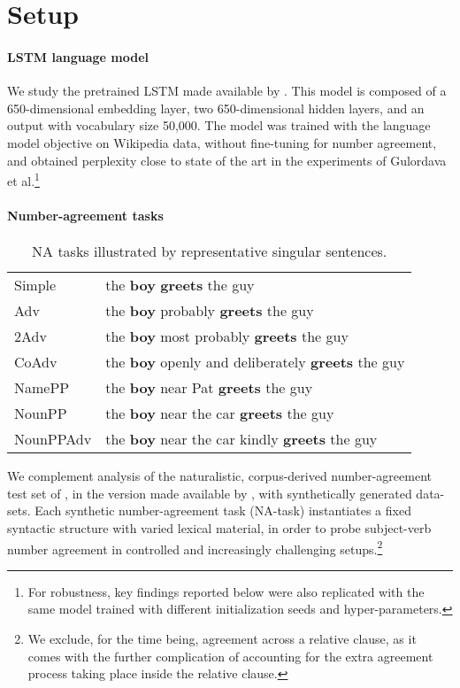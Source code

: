 \section{Setup}\label{sec:the_data}

\paragraph{LSTM language model}\label{ssec:lstm_lm}
We study the pretrained LSTM made available by
.  This model is composed of a
650-dimensional embedding layer, two 650-dimensional hidden layers,
and an output with vocabulary size 50,000. 
The model was trained with the language
model objective on Wikipedia data, without fine-tuning for number
agreement, and obtained perplexity close to state of the art in the experiments of Gulordava et al.\footnote{For robustness, key findings reported below were also replicated with the same model trained with different initialization seeds and hyper-parameters.} 


\paragraph{Number-agreement tasks}
\begin{table}[tb]
  \centering
  \begin{footnotesize}
  \begin{tabular}{l@{\hskip1pt}l}
    \B Simple & the \textbf{boy} \textbf{greets} the guy\\
    \B Adv & the \textbf{boy} probably \textbf{greets} the guy\\
    \B 2Adv & the \textbf{boy} most probably \textbf{greets} the guy\\
    \B CoAdv &  the \textbf{boy} openly and deliberately \textbf{greets} the guy\\
    \B NamePP & the \textbf{boy} near Pat \textbf{greets} the guy\\
    \B NounPP & the \textbf{boy} near the car \textbf{greets} the guy\\
    \B NounPPAdv & the \textbf{boy} near the car kindly \textbf{greets} the guy\\
  \end{tabular}
  \end{footnotesize}
  \caption{NA tasks illustrated by representative
    singular sentences.}
  \label{tab:data-sets}
\end{table}

We complement analysis of the naturalistic, corpus-derived
number-agreement test set of , in the
version made available by , with
synthetically generated data-sets. Each synthetic number-agreement
task (NA-task) instantiates a fixed syntactic structure with varied
lexical material, in order to probe subject-verb number agreement in
controlled and increasingly challenging setups.\footnote{We exclude,
  for the time being, agreement across a relative clause, as it comes
  with the further complication of accounting for the extra agreement
  process taking place inside the relative clause.}

